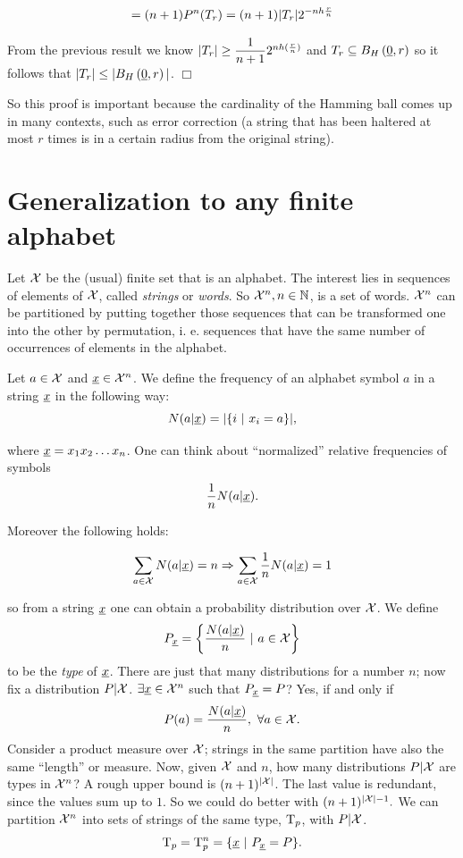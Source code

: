 \[=(n+1)P^n(T_r) = (n + 1)|T_r|2^{-nh\frac{r}{n}}\]

From the previous result we know $|T_r| \geq \dfrac{1}{n+1}2^{nh(\frac{r}{n})}$ and $T_r \subseteq B_H\left(\underline{0}, r\right)$ so it follows that $|T_r| \leq |B_H\left(\underline{0}, r\right)|$. \hfill $\Box$

So this proof is important because the cardinality of the Hamming ball comes up in many contexts, such as error correction (a string that has been haltered at most $r$ times is in a certain radius from the original string).

\section{Generalization to any finite alphabet}

Let $\mathcal{X}$ be the (usual) finite set that is an alphabet. The interest lies in sequences of elements of $\mathcal{X}$, called \emph{strings} or \emph{words}. So $\mathcal{X}^n, n \in \mathbb{N}$, is a set of words. $\mathcal{X}^n$ can be partitioned by putting together those sequences that can be transformed one into the other by permutation, i. e. sequences that have the same number of occurrences of elements in the alphabet.

Let $a \in \mathcal{X}$ and $\underline{x} \in \mathcal{X}^n$. We define the frequency of an alphabet symbol $a$ in a string $\underline{x}$ in the following way:  
\begin{equation}
N(a | \underline{x}) = |\{i\ |\ x_i = a\}|,
\end{equation}

where $\underline{x} = x_1x_2\ldots x_n$. One can think about ``normalized'' relative frequencies of symbols $$\dfrac{1}{n} N(a|\underline{x}).$$

Moreover the following holds:

$$\sum_{a \in \mathcal{X}} N(a|\underline{x}) = n \Rightarrow \sum_{a\in \mathcal{X}} \dfrac{1}{n}N(a|\underline{x}) = 1$$

so from a string $\underline{x}$ one can obtain a probability distribution over $\mathcal{X}$. We define
\begin{equation}
	P_{\str{x}} = \left\{ \dfrac{N(a|\str{x})}{n}\ |\ a \in \xset \right\}
\end{equation}
to be the \emph{type} of $\underline{x}$. There are just that many distributions for a number $n$; now fix a distribution $P|\mathcal{X}$. $\exists \underline{x} \in \mathcal{X}^n$ such that  $P_{\underline{x}} = P$? Yes, if and only if
$$P(a) = \dfrac{N(a | \underline{x})}{n},\ \forall a \in \mathcal{X}.$$ Consider a product measure over $\mathcal{X}$; strings in the same partition have also the same ``length'' or measure. Now, given $\mathcal{X}$ and $n$, how many distributions $P|\mathcal{X}$ are types in $\mathcal{X}^n$? A rough upper bound is $(n + 1)^{|\mathcal{X}|}$. The last value is redundant, since the values sum up to $1$. So we could do better with $(n + 1)^{|\mathcal{X}| - 1}.$ We can partition $\mathcal{X}^n$ into sets of strings of the same type, $\mathrm{T}_p$, with $P|\mathcal{X}$. $$\mathrm{T}_p = \mathrm{T}_p^n = \{\underline{x}\ |\ P_{\underline{x}} = P\}.$$

